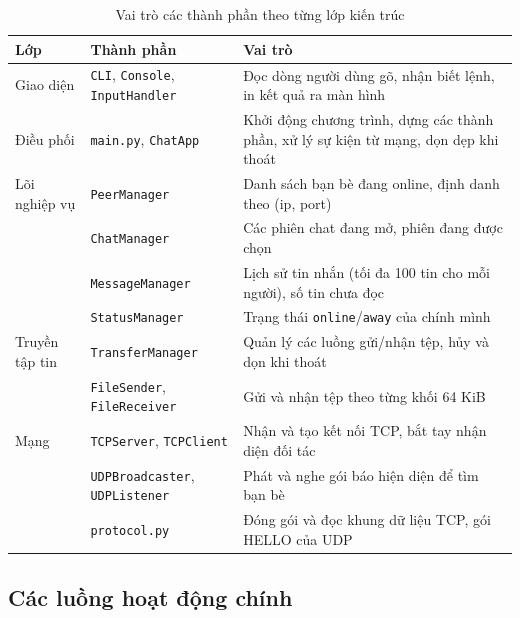\documentclass[a4paper,12pt]{article}
\newcommand{\code}[1]{\texttt{#1}}
\begin{document}
	\begin{table}[H]
		\centering
		\small
		\renewcommand{\arraystretch}{1.35}
		\begin{tabularx}{\textwidth}{|>{\raggedright\arraybackslash}p{2.6cm}|>{\raggedright\arraybackslash}p{4.3cm}|X|}
			\hline
			\rowcolor{blue!12}
			\textcolor{blue!80!black}{\textbf{Lớp}} & \textcolor{blue!80!black}{\textbf{Thành phần}} & \textcolor{blue!80!black}{\textbf{Vai trò}} \\
			\hline
			Giao diện & \code{CLI}, \code{Console}, \code{InputHandler} & Đọc dòng người dùng gõ, nhận biết lệnh, in kết quả ra màn hình \\
			\hline
			Điều phối & \code{main.py}, \code{ChatApp} & Khởi động chương trình, dựng các thành phần, xử lý sự kiện từ mạng, dọn dẹp khi thoát \\
			\hline
			Lõi nghiệp vụ & \code{PeerManager} & Danh sách bạn bè đang online, định danh theo (ip, port) \\
			\hline
			& \code{ChatManager} & Các phiên chat đang mở, phiên đang được chọn \\
			\hline
			& \code{MessageManager} & Lịch sử tin nhắn (tối đa 100 tin cho mỗi người), số tin chưa đọc \\
			\hline
			& \code{StatusManager} & Trạng thái \code{online}/\code{away} của chính mình \\
			\hline
			Truyền tập tin & \code{TransferManager} & Quản lý các luồng gửi/nhận tệp, hủy và dọn khi thoát \\
			\hline
			& \code{FileSender}, \code{FileReceiver} & Gửi và nhận tệp theo từng khối 64 KiB \\
			\hline
			Mạng & \code{TCPServer}, \code{TCPClient} & Nhận và tạo kết nối TCP, bắt tay nhận diện đối tác \\
			\hline
			& \code{UDPBroadcaster}, \code{UDPListener} & Phát và nghe gói báo hiện diện để tìm bạn bè \\
			\hline
			& \code{protocol.py} & Đóng gói và đọc khung dữ liệu TCP, gói HELLO của UDP \\
			\hline
		\end{tabularx}
		\caption{Vai trò các thành phần theo từng lớp kiến trúc}
		\label{tab:architecture_components}
	\end{table}
	
	\subsection{Các luồng hoạt động chính}
	
\end{document}
